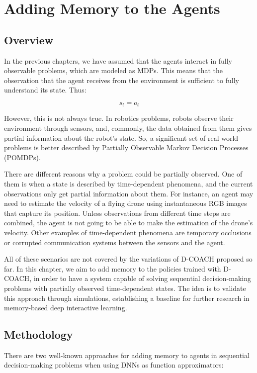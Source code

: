 \chapter{Adding Memory to the Agents}
\section{Overview}
In the previous chapters, we have assumed that the agents interact in fully observable problems, which are modeled as MDPs. This means that the observation that the agent receives from the environment is sufficient to fully understand its state. Thus:

\begin{equation}
    s_{t} = o_{t}
\end{equation}

However, this is not always true. In robotics problems, robots observe their environment through sensors, and, commonly, the data obtained from them gives partial information about the robot's state. So, a significant set of real-world problems is better described by Partially Observable Markov Decision Processes (POMDPs).

There are different reasons why a problem could be partially observed. One of them is when a state is described by time-dependent phenomena, and the current observations only get partial information about them. For instance, an agent may need to estimate the velocity of a flying drone using instantaneous RGB images that capture its position. Unless observations from different time steps are combined, the agent is not going to be able to make the estimation of the drone's velocity. Other examples of time-dependent phenomena are temporary occlusions or corrupted communication systems between the sensors and the agent.

All of these scenarios are not covered by the variations of D-COACH proposed so far. In this chapter, we aim to add memory to the policies trained with D-COACH, in order to have a system capable of solving sequential decision-making problems with partially observed $\text{time-dependent}$ states. The idea is to validate this approach through simulations, establishing a baseline for further research in memory-based deep interactive learning.
\newpage

\section{Methodology}
There are two well-known approaches for adding memory to agents in sequential decision-making problems when using DNNs as function approximators:

